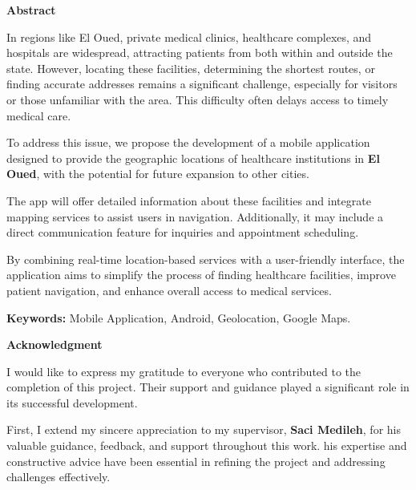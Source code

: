 \documentclass[12pt]{report}
\begin{document}
\tableofcontents
\newpage
\begin{center}
	\textbf{Abstract} \\
	\vspace*{0.3cm}
\end{center}

\noindent In regions like El Oued, private medical clinics, healthcare complexes, and hospitals are widespread, attracting patients from both within and outside the state. However, locating these facilities, determining the shortest routes, or finding accurate addresses remains a significant challenge, especially for visitors or those unfamiliar with the area. This difficulty often delays access to timely medical care. \vspace*{0.5cm}

\noindent To address this issue, we propose the development of a mobile application designed to provide the geographic locations of healthcare institutions in \textbf{El Oued}, with the potential for future expansion to other cities. \vspace*{0.5cm}

\noindent The app will offer detailed information about these facilities and integrate mapping services to assist users in navigation. Additionally, it may include a direct communication feature for inquiries and appointment scheduling. \vspace*{0.5cm}

\noindent By combining real-time location-based services with a user-friendly interface, the application aims to simplify the process of finding healthcare facilities, improve patient navigation, and enhance overall access to medical services. \vspace*{0.5cm}

\noindent \vspace*{0.5cm}\textbf{Keywords:} Mobile Application, Android, Geolocation, Google Maps.
\newpage
\begin{center}
	\textbf{Acknowledgment} \\
	\vspace*{0.3cm}
\end{center}

\noindent I would like to express my gratitude to everyone who contributed to the completion of this project. Their support and guidance played a significant role in its successful development.  \vspace*{0.5cm}

\noindent First, I extend my sincere appreciation to my supervisor, \textbf{Saci Medileh}, for his valuable guidance, feedback, and support throughout this work. his expertise and constructive advice have been essential in refining the project and addressing challenges effectively. \vspace*{0.5cm}
\end{document}
